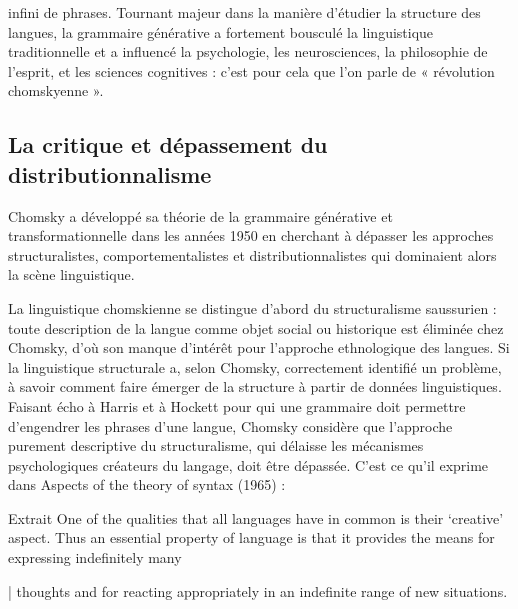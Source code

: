 
infini de phrases. Tournant majeur dans la manière d’étudier la structure des langues, la grammaire générative a fortement bousculé la linguistique traditionnelle et a influencé la psychologie, les neurosciences, la philosophie de l’esprit, et les sciences cognitives : c’est pour cela que l’on parle de « révolution chomskyenne ».\par

\subsection{La critique et dépassement du distributionnalisme}
Chomsky a développé sa théorie de la grammaire générative et transformationnelle dans les années 1950 en cherchant à dépasser les approches structuralistes, comportementalistes et distributionnalistes qui dominaient alors la scène linguistique.\par


La linguistique chomskienne se distingue d’abord du structuralisme saussurien : toute description de la langue comme objet social ou historique est éliminée chez Chomsky, d’où son manque d’intérêt pour l’approche ethnologique des langues. Si la linguistique structurale a, selon Chomsky, correctement identifié un problème, à savoir comment faire émerger de la structure à partir de données linguistiques. Faisant écho à Harris et à Hockett pour qui une grammaire doit permettre d’engendrer les phrases d’une langue, Chomsky considère que l’approche purement descriptive du structuralisme, qui délaisse les mécanismes psychologiques créateurs du langage, doit être dépassée. C’est ce qu’il exprime dans Aspects of the theory of syntax (1965) :\par


\begin{lecture}{Extrait}
One of the qualities that all languages have in common is their ‘creative’ aspect. Thus an essential property of language is that it provides the means for expressing indefinitely many\par

| thoughts and for reacting appropriately in an indefinite range of new situations.
\end{lecture}
\par

